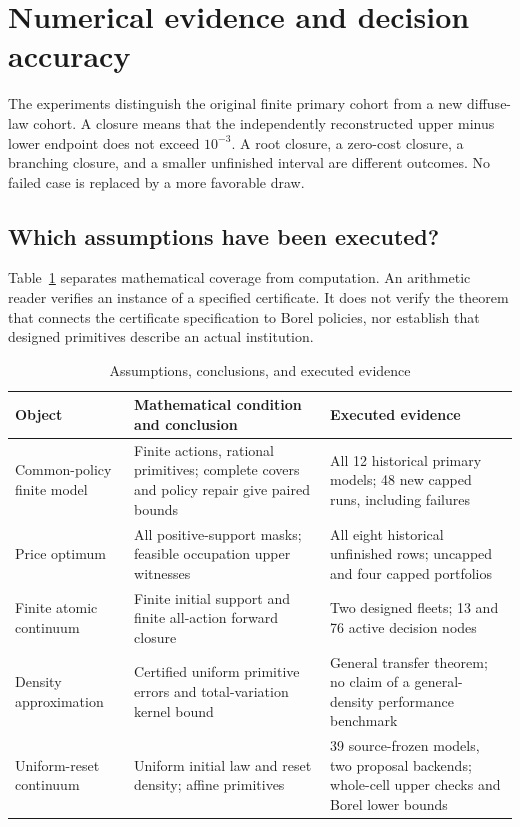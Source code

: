 \section{Numerical evidence and decision accuracy}\label{sec:evidence48}\label{sec:evidence50}
The experiments distinguish the original finite primary cohort from a new diffuse-law cohort. A closure means that the independently reconstructed upper minus lower endpoint does not exceed $10^{-3}$. A root closure, a zero-cost closure, a branching closure, and a smaller unfinished interval are different outcomes. No failed case is replaced by a more favorable draw.

\subsection{Which assumptions have been executed?}
Table~\ref{tab:assumptions50} separates mathematical coverage from computation. An arithmetic reader verifies an instance of a specified certificate. It does not verify the theorem that connects the certificate specification to Borel policies, nor establish that designed primitives describe an actual institution.
\begin{table}[htbp]\centering\small
\caption{Assumptions, conclusions, and executed evidence}\label{tab:assumptions50}
\begin{tabularx}{\textwidth}{@{}p{}XX@{}}\toprule
Object & Mathematical condition and conclusion & Executed evidence\\\midrule
Common-policy finite model & Finite actions, rational primitives; complete covers and policy repair give paired bounds & All 12 historical primary models; 48 new capped runs, including failures\\
Price optimum & All positive-support masks; feasible occupation upper witnesses & All eight historical unfinished rows; uncapped and four capped portfolios\\
Finite atomic continuum & Finite initial support and finite all-action forward closure & Two designed fleets; 13 and 76 active decision nodes\\
Density approximation & Certified uniform primitive errors and total-variation kernel bound & General transfer theorem; no claim of a general-density performance benchmark\\
Uniform-reset continuum & Uniform initial law and reset density; affine primitives & 39 source-frozen models, two proposal backends; whole-cell upper checks and Borel lower bounds\\\bottomrule
\end{tabularx}
\end{table}

